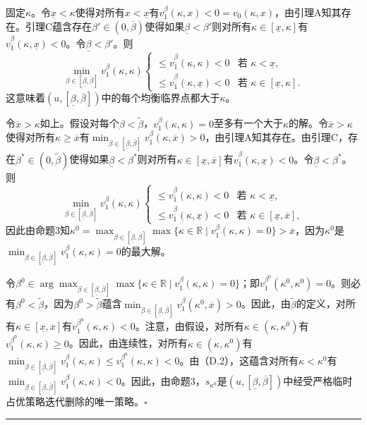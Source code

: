 \documentclass[12pt,a4paper]{article}
\newenvironment{translation}
  {\par\noindent\color{darkblue}\ignorespaces}
  {\par\medskip\noindent\hrule\par\medskip}
\theoremstyle{definition}
\theoremstyle{remark}
\begin{document}
\begin{translation}
固定$\kappa$。令$\underline{x} < \kappa$使得对所有$x < \underline{x}$有$v_1^\beta(\kappa, x) < 0 = v_0(\kappa, x)$，由引理A知其存在。引理C蕴含存在$\beta' \in (0, \overline{\beta})$使得如果$\underline{\beta} < \beta'$则对所有$\kappa \in [\underline{x}, \kappa]$有$v_1^{\underline{\beta}}(\kappa, \underline{x}) < 0$。令$\underline{\beta} < \beta'$。则
\[
\min_{\beta \in [\underline{\beta}, \overline{\beta}]} v_1^\beta(\kappa, \kappa)
\begin{cases}
\le v_1^{\underline{\beta}}(\kappa, \kappa) < 0 & \text{若 } \kappa < \underline{x},\\
\le v_1^{\underline{\beta}}(\kappa, \underline{x}) < 0 & \text{若 } \kappa \in [\underline{x}, \kappa].
\end{cases}
\]
这意味着$(u, [\underline{\beta}, \overline{\beta}])$中的每个均衡临界点都大于$\kappa$。

令$\overline{x} > \kappa$如上。假设对每个$\beta < \tilde{\beta}$，$v_1^\beta(\kappa, \kappa) = 0$至多有一个大于$\kappa$的解。令$\overline{x} > \kappa$使得对所有$\kappa \ge \overline{x}$有$\min_{\beta \in [\underline{\beta}, \overline{\beta}]} v_1^\beta(\kappa, \overline{x}) > 0$，由引理A知其存在。由引理C，存在$\beta^* \in (0, \tilde{\beta})$使得如果$\underline{\beta} < \beta^*$则对所有$\kappa \in [\underline{x}, \overline{x}]$有$v_1^{\underline{\beta}}(\kappa, \underline{x}) < 0$。令$\underline{\beta} < \beta^*$。则
\[
\min_{\beta \in [\underline{\beta}, \overline{\beta}]} v_1^\beta(\kappa, \kappa)
\begin{cases}
\le v_1^{\underline{\beta}}(\kappa, \kappa) < 0 & \text{若 } \kappa < \underline{x},\\
\le v_1^{\underline{\beta}}(\kappa, \underline{x}) < 0 & \text{若 } \kappa \in [\underline{x}, \overline{x}],
\end{cases}
\tag{D.2}
\]
因此由命题3知$\kappa^0 = \max_{\beta \in [\underline{\beta}, \overline{\beta}]} \max\{\kappa \in \mathbb{R} \mid v_1^\beta(\kappa, \kappa) = 0\} > \overline{x}$，因为$\kappa^0$是$\min_{\beta \in [\underline{\beta}, \overline{\beta}]} v_1^\beta(\kappa, \kappa) = 0$的最大解。

令$\beta^0 \in \arg\max_{\beta \in [\underline{\beta}, \overline{\beta}]} \max\{\kappa \in \mathbb{R} \mid v_1^\beta(\kappa, \kappa) = 0\}$；即$v_1^{\beta^0}(\kappa^0, \kappa^0) = 0$。则必有$\beta^0 < \tilde{\beta}$，因为$\beta^0 > \tilde{\beta}$蕴含$\min_{\beta \in [\underline{\beta}, \overline{\beta}]} v_1^\beta(\kappa^0, \overline{x}) > 0$。因此，由$\tilde{\beta}$的定义，对所有$\kappa \in [\underline{x}, \overline{x}]$有$v_1^{\beta^0}(\kappa, \kappa) < 0$。注意，由假设，对所有$\kappa \in (\kappa, \kappa^0)$有$v_1^{\beta^0}(\kappa, \kappa) \ge 0$。因此，由连续性，对所有$\kappa \in (\kappa, \kappa^0)$有$\min_{\beta \in [\underline{\beta}, \overline{\beta}]} v_1^\beta(\kappa, \kappa) \le v_1^{\beta^0}(\kappa, \kappa) < 0$。由（D.2），这蕴含对所有$\kappa < \kappa^0$有$\min_{\beta \in [\underline{\beta}, \overline{\beta}]} v_1^\beta(\kappa, \kappa) < 0$。因此，由命题3，$s_{\kappa^0}$是$(u, [\underline{\beta}, \overline{\beta}])$中经受严格临时占优策略迭代删除的唯一策略。$\square$
\end{translation}
\end{document}
